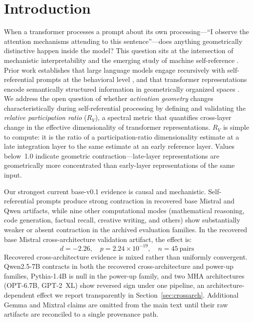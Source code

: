 \documentclass{article}
\newcommand{\RV}{R_V}
\newcommand{\dcohen}{d}
\begin{document}
\section{Introduction}
\label{sec:intro}

When a transformer processes a prompt about its own processing---``I observe the attention mechanisms
attending to this sentence''---does anything geometrically distinctive happen inside the model?
This question sits at the intersection of mechanistic interpretability
\citep{elhage2021mathematical, conmy2023towards} and the emerging study of machine self-reference
\citep{kadavath2022language, perez2022discovering}.
Prior work establishes that large language models engage recursively with self-referential prompts
at the behavioral level \citep{chen2024self}, and that transformer representations encode
semantically structured information in geometrically organized spaces \citep{park2024geometry,
marks2024geometry}.
We address the open question of whether \emph{activation geometry} changes characteristically
during self-referential processing by defining and validating the \emph{relative participation
ratio} ($\RV$), a spectral metric that quantifies cross-layer change in the effective
dimensionality of transformer representations.
$\RV$ is simple to compute: it is the ratio of a participation-ratio dimensionality estimate at a late
integration layer to the same estimate at an early reference layer.
Values below~1.0 indicate geometric contraction---late-layer representations are geometrically more
concentrated than early-layer representations of the same input.

Our strongest current base-v0.1 evidence is causal and mechanistic.
Self-referential prompts produce strong contraction in recovered base Mistral and Qwen artifacts,
while nine other computational modes (mathematical reasoning, code generation, factual recall,
creative writing, and others) show substantially weaker or absent contraction in the archived
evaluation families.
In the recovered base Mistral cross-architecture validation artifact, the effect is:
\begin{equation}
\dcohen = -2.26, \quad p = 2.24 \times 10^{-19}, \quad n = 45\ \text{pairs}
\label{eq:intro_effect}
\end{equation}
Recovered cross-architecture evidence is mixed rather than uniformly convergent.
Qwen2.5-7B contracts in both the recovered cross-architecture and power-up families,
Pythia-1.4B is null in the power-up family, and two MHA architectures (OPT-6.7B, GPT-2~XL)
show reversed sign under one pipeline, an architecture-dependent effect we report
transparently in Section~\ref{sec:crossarch}.
Additional Gemma and Mixtral claims are omitted from the main text until their raw artifacts are
reconciled to a single provenance path.
\end{document}
